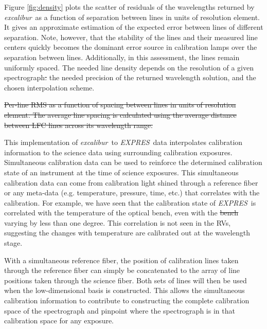 \documentclass[twocolumn,table,xcolor,trackchanges]{aastex63} %
\newcommand{\project}[1]{\textsl{#1}}
\newcommand{\name}{\project{excalibur}}
\newcommand{\acronym}[1]{{\small{#1}}}
\newcommand{\expres}{\project{\acronym{EXPRES}}}
\providecommand{\DIFadd}[1]{{\protect\color{blue}\uwave{#1}}} %
\providecommand{\DIFdel}[1]{{\protect\color{red}\sout{#1}}}                      %
\providecommand{\DIFaddbegin}{} %
\providecommand{\DIFaddend}{} %
\providecommand{\DIFdelbegin}{} %
\providecommand{\DIFdelend}{} %
\providecommand{\DIFdelFL}[1]{\DIFdel{#1}} %
\begin{document}
\DIFaddend Figure \ref{fig:density} plots the scatter of residuals of the wavelengths returned by \name\ as a function of separation between lines in units of resolution element.  It gives an approximate estimation of the expected error between lines of different separation.  Note, however, that the stability of the lines and their measured line centers quickly becomes the dominant error source in calibration lamps over the separation between lines.  Additionally, in this assessment, the lines remain uniformly spaced.  The needed line density depends on the resolution of a given spectrograph\DIFdelbegin \DIFdel{. }\DIFdelend \DIFaddbegin \DIFadd{, }\DIFaddend the needed precision of the returned wavelength solution, and the chosen interpolation scheme.

\DIFdelbegin %
{%
\DIFdelFL{Per-line RMS as a function of spacing between lines in units of resolution element.  The average line spacing is calculated using the average distance between LFC lines across its wavelength range.}}

\DIFdelend This implementation of \name\ to \expres\ data interpolates calibration information to the science data using surrounding calibration exposures.  Simultaneous calibration data can be used to reinforce the determined calibration state of an instrument at the time of science exposures.  This simultaneous calibration data can come from calibration light shined through a reference fiber or any meta-data (e.g. temperature, pressure, time, etc.) that correlates with the calibration.  For example, we have seen that the calibration state of \expres\ is correlated with the temperature of the optical bench, even with the \DIFdelbegin \DIFdel{bench }\DIFdelend \DIFaddbegin \DIFadd{optical bench temperature }\DIFaddend varying by less than one degree.  This correlation is not seen in the RVs, suggesting the changes with temperature are calibrated out at the wavelength stage.

With a simultaneous reference fiber, the position of calibration lines taken through the reference fiber can simply be concatenated to the array of line positions taken through the science fiber.  Both sets of lines will then be used when the low-dimensional basis is constructed.  This allows the simultaneous calibration information to contribute to constructing the complete calibration space of the spectrograph and pinpoint where the spectrograph is in that calibration space for any exposure.
\end{document}
